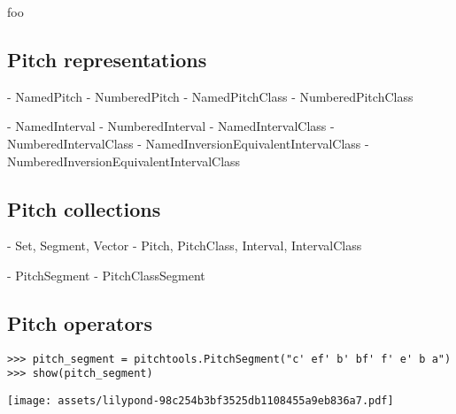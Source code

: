 foo

\subsection{Pitch representations}

\begin{markdown}
- NamedPitch
- NumberedPitch
- NamedPitchClass
- NumberedPitchClass
\end{markdown}

\begin{markdown}
- NamedInterval
- NumberedInterval
- NamedIntervalClass
- NumberedIntervalClass
- NamedInversionEquivalentIntervalClass
- NumberedInversionEquivalentIntervalClass
\end{markdown}

\subsection{Pitch collections}

\begin{markdown}
- Set, Segment, Vector
- Pitch, PitchClass, Interval, IntervalClass
\end{markdown}

\begin{markdown}
- PitchSegment
- PitchClassSegment
\end{markdown}

\subsection{Pitch operators}

\begin{comment}
<abjad>
pitch_segment = pitchtools.PitchSegment("c' ef' b' bf' f' e' b a")
show(pitch_segment)
</abjad>
\end{comment}

\begin{singlespacing}
\vspace{-0.5\baselineskip}
\begin{lstlisting}
>>> pitch_segment = pitchtools.PitchSegment("c' ef' b' bf' f' e' b a")
>>> show(pitch_segment)
\end{lstlisting}
\noindent\texttt{[image: assets/lilypond-98c254b3bf3525db1108455a9eb836a7.pdf]}
\end{singlespacing}

\begin{comment}
<abjad>
transposition = pitchtools.Transposition(1)
show(transposition(pitch_segment))
</abjad>
\end{comment}

